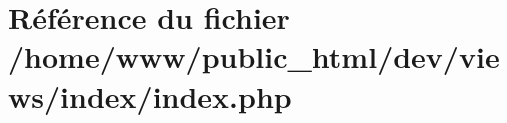 \hypertarget{views_2index_2index_8php}{\section{Référence du fichier /home/www/public\-\_\-html/dev/views/index/index.php}
\label{views_2index_2index_8php}
}
